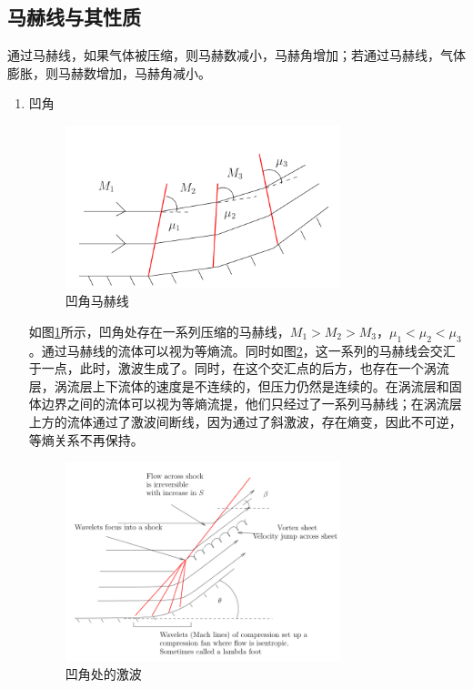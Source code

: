 \subsection{马赫线与其性质}

通过马赫线，如果气体被压缩，则马赫数减小，马赫角增加；若通过马赫线，气体膨胀，则马赫数增加，马赫角减小。

\begin{enumerate}
    \item 凹角

    \begin{figure}[!ht]
        \centering
        \includegraphics[width=8cm]{figures/10.png}
        \caption{凹角马赫线}
        \label{10}
    \end{figure}

    如图\ref{10}所示，凹角处存在一系列压缩的马赫线，$M_1>M_2>M_3$，$\mu_1<\mu_2<\mu_3$。通过马赫线的流体可以视为等熵流。同时如图\ref{11}，这一系列的马赫线会交汇于一点，此时，激波生成了。同时，在这个交汇点的后方，也存在一个涡流层，涡流层上下流体的速度是不连续的，但压力仍然是连续的。在涡流层和固体边界之间的流体可以视为等熵流提，他们只经过了一系列马赫线；在涡流层上方的流体通过了激波间断线，因为通过了斜激波，存在熵变，因此不可逆，等熵关系不再保持。

    \begin{figure}[!ht]
        \centering
        \includegraphics[width=8cm]{figures/11.png}
        \caption{凹角处的激波}
        \label{11}
    \end{figure}


\end{enumerate}
